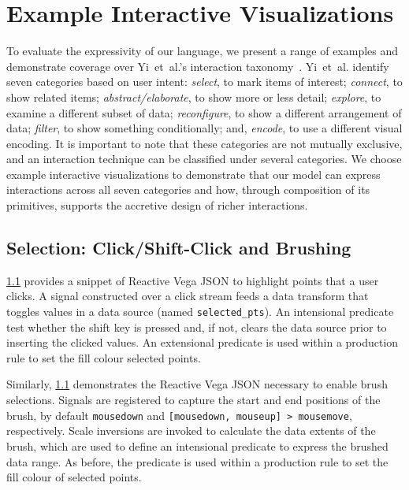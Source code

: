 \section{Example Interactive Visualizations}
\label{sec:vg:examples}

To evaluate the expressivity of our language, we present a range of examples and
demonstrate coverage over Yi~et~al.'s interaction
taxonomy~\cite{yi:understanding}. Yi~et~al. identify seven categories based on
user intent: \emph{select}, to mark items of interest; \emph{connect}, to show
related items; \emph{abstract/elaborate}, to show more or less detail;
\emph{explore}, to examine a different subset of data; \emph{reconfigure}, to
show a different arrangement of data; \emph{filter}, to show something
conditionally; and, \emph{encode}, to use a different visual encoding. It is
important to note that these categories are not mutually exclusive, and an
interaction technique can be classified under several categories. We choose
example interactive visualizations to demonstrate that our model can express
interactions across all seven categories and how, through composition of its
primitives, supports the accretive design of richer interactions.

\subsection{Selection: Click/Shift-Click and Brushing}

\cref{} provides a snippet of Reactive Vega JSON to highlight
points that a user clicks. A signal constructed over a click stream feeds a data
transform that toggles values in a data source (named \texttt{selected\_pts}).
An intensional predicate test whether the shift key is pressed and, if not,
clears the data source prior to inserting the clicked values. An extensional
predicate is used within a production rule to set the fill colour selected
points.

Similarly, \cref{} demonstrates the Reactive Vega JSON necessary to
enable brush selections. Signals are registered to capture the start and end
positions of the brush, by default \texttt{mousedown} and \texttt{[mousedown,
mouseup] > mousemove}, respectively. Scale inversions are invoked to calculate
the data extents of the brush, which are used to define an intensional predicate
to express the brushed data range. As before, the predicate is used within a
production rule to set the fill colour of selected points.

